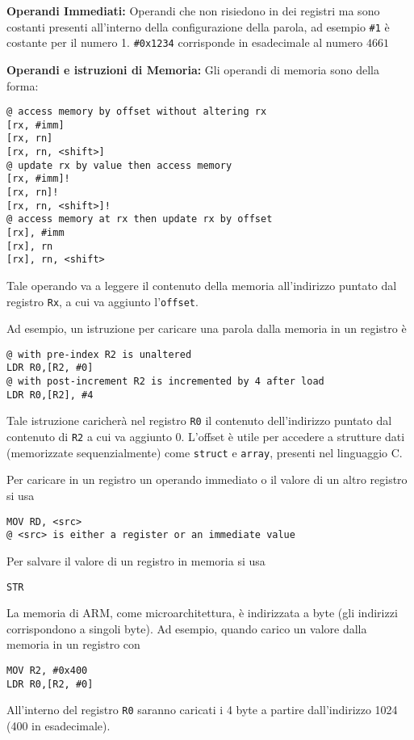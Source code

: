 \begin{defn}
\textbf{Operandi Immediati:}
Operandi che non risiedono in dei registri ma sono costanti presenti all'interno della configurazione della parola, ad esempio \verb|#1| è costante per il numero 1. \verb|#0x1234| corrisponde in esadecimale al numero $ 4661 $
\end{defn}

\begin{defn}
\textbf{Operandi e istruzioni di Memoria:}
Gli operandi di memoria sono della forma:
\begin{lstlisting}[style=arm]
@ access memory by offset without altering rx
[rx, #imm]
[rx, rn]
[rx, rn, <shift>]
@ update rx by value then access memory
[rx, #imm]!
[rx, rn]!
[rx, rn, <shift>]!
@ access memory at rx then update rx by offset
[rx], #imm
[rx], rn
[rx], rn, <shift>
\end{lstlisting}

Tale operando va a leggere il contenuto della memoria all'indirizzo puntato dal registro \verb|Rx|, a cui va aggiunto l'\verb|offset|.

Ad esempio, un istruzione per caricare una parola dalla memoria in un registro è
\begin{lstlisting}[style=arm]
@ with pre-index R2 is unaltered
LDR R0,[R2, #0]
@ with post-increment R2 is incremented by 4 after load
LDR R0,[R2], #4
\end{lstlisting}

Tale istruzione caricherà nel registro \verb|R0| il contenuto dell'indirizzo puntato dal contenuto di \verb|R2| a cui va aggiunto 0. L'offset è utile per accedere a strutture dati (memorizzate sequenzialmente) come \verb|struct| e \verb|array|, presenti nel linguaggio C.

Per caricare in un registro un operando immediato o il valore di un altro registro si usa
\begin{lstlisting}[style=arm]
MOV RD, <src>
@ <src> is either a register or an immediate value
\end{lstlisting}

Per salvare il valore di un registro in memoria si usa
\begin{lstlisting}[style=arm]
STR
\end{lstlisting}
\end{defn}

\begin{note}
La memoria di ARM, come microarchitettura, è indirizzata a byte (gli indirizzi corrispondono a singoli byte). Ad esempio, quando carico un valore dalla memoria in un registro con
\begin{lstlisting}[style=arm]
MOV R2, #0x400
LDR R0,[R2, #0]
\end{lstlisting}

All'interno del registro \verb|R0| saranno caricati i 4 byte a partire dall'indirizzo 1024 (400 in esadecimale).
\end{note}

